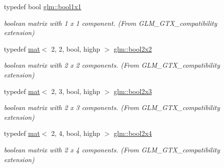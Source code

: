 \begin{DoxyCompactItemize}
\mbox{\label{group__gtx__compatibility_ga98d9d3da22aebc872ba38ce5afa0eff7}} 
typedef bool \hyperlink{group__gtx__compatibility_ga98d9d3da22aebc872ba38ce5afa0eff7}{glm\+::bool1x1}
\begin{DoxyCompactList}\small\item\em boolean matrix with 1 x 1 component. (From G\+L\+M\+\_\+\+G\+T\+X\+\_\+compatibility extension) \end{DoxyCompactList}\item 
\mbox{\label{group__gtx__compatibility_ga1a3707855138ba2d14b7f2ccfb93f476}} 
typedef \hyperlink{structglm_1_1mat}{mat}$<$ 2, 2, bool, highp $>$ \hyperlink{group__gtx__compatibility_ga1a3707855138ba2d14b7f2ccfb93f476}{glm\+::bool2x2}
\begin{DoxyCompactList}\small\item\em boolean matrix with 2 x 2 components. (From G\+L\+M\+\_\+\+G\+T\+X\+\_\+compatibility extension) \end{DoxyCompactList}\item 
\mbox{\label{group__gtx__compatibility_gabbcc655d12f2f13ddc1917414389e8e1}} 
typedef \hyperlink{structglm_1_1mat}{mat}$<$ 2, 3, bool, highp $>$ \hyperlink{group__gtx__compatibility_gabbcc655d12f2f13ddc1917414389e8e1}{glm\+::bool2x3}
\begin{DoxyCompactList}\small\item\em boolean matrix with 2 x 3 components. (From G\+L\+M\+\_\+\+G\+T\+X\+\_\+compatibility extension) \end{DoxyCompactList}\item 
\mbox{\label{group__gtx__compatibility_gaa709e6df01dc0ae495c0b5c901a0a181}} 
typedef \hyperlink{structglm_1_1mat}{mat}$<$ 2, 4, bool, highp $>$ \hyperlink{group__gtx__compatibility_gaa709e6df01dc0ae495c0b5c901a0a181}{glm\+::bool2x4}
\begin{DoxyCompactList}\small\item\em boolean matrix with 2 x 4 components. (From G\+L\+M\+\_\+\+G\+T\+X\+\_\+compatibility extension) \end{DoxyCompactList}\item 
\mbox{\label{group__gtx__compatibility_ga24674530ea1f5c4e78ba3932dcd7504a}} 

\end{DoxyCompactItemize}
